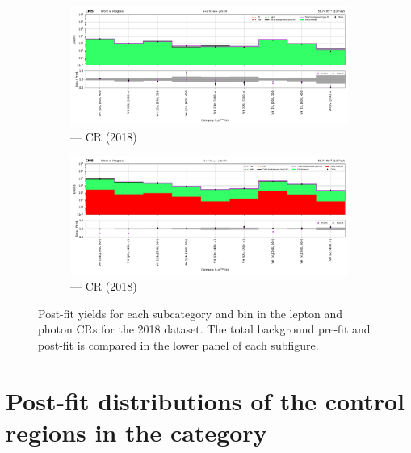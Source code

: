 \begin{figure}[htbp]
    \begin{subfigure}[b]{0.66\textwidth}
        \includegraphics[width=\textwidth]{chapters/higgstoinv/figures/mountain_ranges/2018/VH/Zee_tree_fit_s-abs_values_VH_cats.pdf}
        \caption{\VH --- \doubleEleCr \gls{CR} (2018)}
    \end{subfigure}

    \begin{subfigure}[b]{0.66\textwidth}
        \includegraphics[width=\textwidth]{chapters/higgstoinv/figures/mountain_ranges/2018/VH/Photon_tree_fit_s-abs_values_VH_cats.pdf}
        \caption{\VH --- \singlePhotonCr \gls{CR} (2018)}
    \end{subfigure}
    \caption[Post-fit yields for each \VH subcategory and \ptmiss bin in the lepton and photon control regions for the 2018 dataset]{Post-fit yields for each \VH subcategory and \ptmiss bin in the lepton and photon \glspl{CR} for the 2018 dataset. The total background pre-fit and post-fit is compared in the lower panel of each subfigure.}
    \label{fig:htoinv_mountain_range_VH_2018_CRs}
\end{figure}




\section{Post-fit distributions of the control regions in the \texorpdfstring{\ggH}{ggH} category}
\label{sec:pre_post_fit_plots_ggF_CRs}

